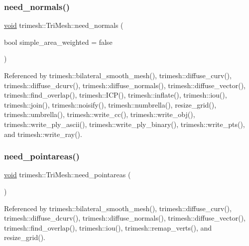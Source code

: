 \subsubsection{\texorpdfstring{need\+\_\+normals()}{need\_normals()}}
{\footnotesize\ttfamily \hyperlink{namespacetrimesh_a784ddfd979e1c579bda795a8edfc3f43}{void} trimesh\+::\+Tri\+Mesh\+::need\+\_\+normals (\begin{DoxyParamCaption}\item[{bool}]{simple\+\_\+area\+\_\+weighted = {\ttfamily false} }\end{DoxyParamCaption})}



Referenced by trimesh\+::bilateral\+\_\+smooth\+\_\+mesh(), trimesh\+::diffuse\+\_\+curv(), trimesh\+::diffuse\+\_\+dcurv(), trimesh\+::diffuse\+\_\+normals(), trimesh\+::diffuse\+\_\+vector(), trimesh\+::find\+\_\+overlap(), trimesh\+::\+I\+C\+P(), trimesh\+::inflate(), trimesh\+::iou(), trimesh\+::join(), trimesh\+::noisify(), trimesh\+::numbrella(), resize\+\_\+grid(), trimesh\+::umbrella(), trimesh\+::write\+\_\+cc(), trimesh\+::write\+\_\+obj(), trimesh\+::write\+\_\+ply\+\_\+ascii(), trimesh\+::write\+\_\+ply\+\_\+binary(), trimesh\+::write\+\_\+pts(), and trimesh\+::write\+\_\+ray().

\mbox{\label{classtrimesh_1_1TriMesh_a1b233589a2daa141c52e89019ca7c9f7}} 
\subsubsection{\texorpdfstring{need\+\_\+pointareas()}{need\_pointareas()}}
{\footnotesize\ttfamily \hyperlink{namespacetrimesh_a784ddfd979e1c579bda795a8edfc3f43}{void} trimesh\+::\+Tri\+Mesh\+::need\+\_\+pointareas (\begin{DoxyParamCaption}{ }\end{DoxyParamCaption})}



Referenced by trimesh\+::bilateral\+\_\+smooth\+\_\+mesh(), trimesh\+::diffuse\+\_\+curv(), trimesh\+::diffuse\+\_\+dcurv(), trimesh\+::diffuse\+\_\+normals(), trimesh\+::diffuse\+\_\+vector(), trimesh\+::find\+\_\+overlap(), trimesh\+::iou(), trimesh\+::remap\+\_\+verts(), and resize\+\_\+grid().

